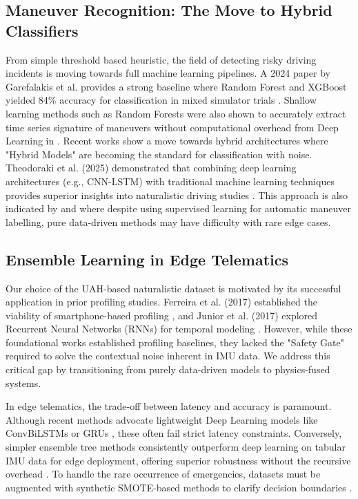\documentclass[pdflatex,sn-mathphys-num]{sn-jnl}
\theoremstyle{thmstyleone}
\theoremstyle{thmstyletwo}
\theoremstyle{thmstylethree}
\begin{document}
\subsection{Maneuver Recognition: The Move to Hybrid Classifiers}
From simple threshold based heuristic, the field of detecting risky driving incidents is moving towards full machine learning pipelines. A 2024 paper by Garefalakis et al. provides a strong baseline where Random Forest and XGBoost yielded 84\% accuracy for classification in mixed simulator trials \cite{garefalakis2024}. Shallow learning methods such as Random Forests were also shown to accurately extract time series signature of maneuvers without computational overhead from Deep Learning in \cite{xie2019}. Recent works show a move towards hybrid architectures where "Hybrid Models" are becoming the standard for classification with noise. Theodoraki et al. (2025) demonstrated that combining deep learning architectures (e.g., CNN-LSTM) with traditional machine learning techniques provides superior insights into naturalistic driving studies \cite{theodoraki2025}. This approach is also indicated by \cite{ijis2025} and \cite{ieee2025} where despite using supervised learning for automatic maneuver labelling, pure data-driven methods may have difficulty with rare edge cases.

\FloatBarrier
\subsection{Ensemble Learning in Edge Telematics}
Our choice of the UAH-based naturalistic dataset is motivated by its successful application in prior profiling studies. Ferreira et al. (2017) established the viability of smartphone-based profiling \cite{ferreira2017}, and Junior et al. (2017) explored Recurrent Neural Networks (RNNs) for temporal modeling \cite{junior2017}. However, while these foundational works established profiling baselines, they lacked the "Safety Gate" required to solve the contextual noise inherent in IMU data. We address this critical gap by transitioning from purely data-driven models to physics-fused systems.

In edge telematics, the trade-off between latency and accuracy is paramount. Although recent methods advocate lightweight Deep Learning models like ConvBiLSTMs \cite{mva2025} or GRUs \cite{ngc2025}, these often fail strict latency constraints. Conversely, simpler ensemble tree methods consistently outperform deep learning on tabular IMU data for edge deployment, offering superior robustness without the recursive overhead \cite{access2019, mdpi2024}. To handle the rare occurrence of emergencies, datasets must be augmented with synthetic SMOTE-based methods to clarify decision boundaries \cite{access2021}.
\end{document}
